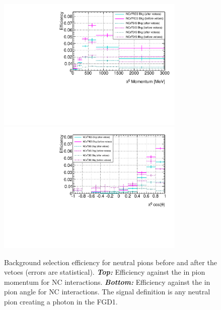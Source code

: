 \begin{figure}[ht]
  \center
  \includegraphics[width=0.8\textwidth]{images/NCg/Eff_1D_NCpPi0.pdf} \\
  \includegraphics[width=0.8\textwidth]{images/NCg/Eff_1D_NCctPi0.pdf}
  \caption[Background selection efficiency for neutral pions before
  and after the vetoes]{Background selection efficiency for neutral
    pions before and after the vetoes (errors are
    statistical). \textbf{\textit{Top:}} Efficiency against the in
    pion momentum for \Gls{NC} interactions.
    \textbf{\textit{Bottom:}} Efficiency against the in pion angle for
    \Gls{NC} interactions. The signal definition is any neutral pion
    creating a photon in the \Gls{FGD}1.}
  \label{fig:pizeff1}
\end{figure}


